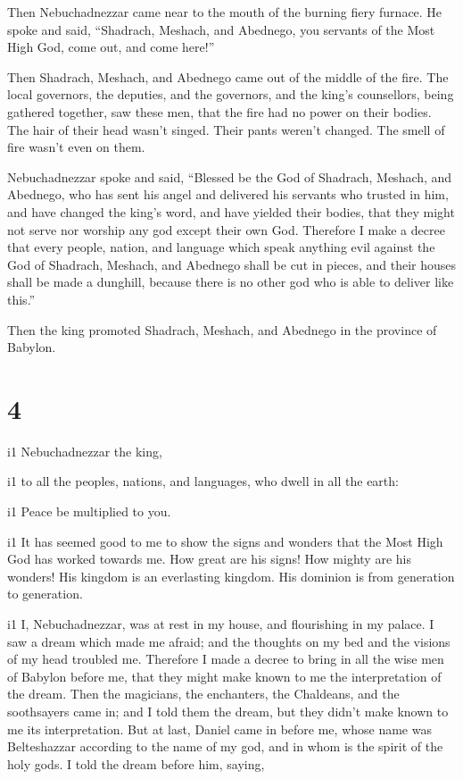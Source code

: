  Then Nebuchadnezzar came near to the mouth of the
burning fiery furnace. He spoke and said, ``Shadrach, Meshach, and
Abednego, you servants of the Most High God, come out, and come here!''

Then Shadrach, Meshach, and Abednego came out of the middle of the fire.
 The local governors, the deputies, and the governors,
and the king's counsellors, being gathered together, saw these men, that
the fire had no power on their bodies. The hair of their head wasn't
singed. Their pants weren't changed. The smell of fire wasn't even on
them.

 Nebuchadnezzar spoke and said, ``Blessed be the God of
Shadrach, Meshach, and Abednego, who has sent his angel and delivered
his servants who trusted in him, and have changed the king's word, and
have yielded their bodies, that they might not serve nor worship any god
except their own God.  Therefore I make a decree that
every people, nation, and language which speak anything evil against the
God of Shadrach, Meshach, and Abednego shall be cut in pieces, and their
houses shall be made a dunghill, because there is no other god who is
able to deliver like this.''

 Then the king promoted Shadrach, Meshach, and Abednego
in the province of Babylon.

\hypertarget{section-3}{%
\section{4}\label{section-3}}

i1 Nebuchadnezzar the king,

i1 to all the peoples, nations, and languages, who dwell in all the
earth:

i1 Peace be multiplied to you.

i1 It has seemed good to me to show the signs and wonders
that the Most High God has worked towards me.  How great
are his signs! How mighty are his wonders! His kingdom is an everlasting
kingdom. His dominion is from generation to generation.

i1 I, Nebuchadnezzar, was at rest in my house, and
flourishing in my palace.  I saw a dream which made me
afraid; and the thoughts on my bed and the visions of my head troubled
me.  Therefore I made a decree to bring in all the wise
men of Babylon before me, that they might make known to me the
interpretation of the dream.  Then the magicians, the
enchanters, the Chaldeans, and the soothsayers came in; and I told them
the dream, but they didn't make known to me its interpretation.
 But at last, Daniel came in before me, whose name was
Belteshazzar according to the name of my god, and in whom is the spirit
of the holy gods. I told the dream before him, saying,

